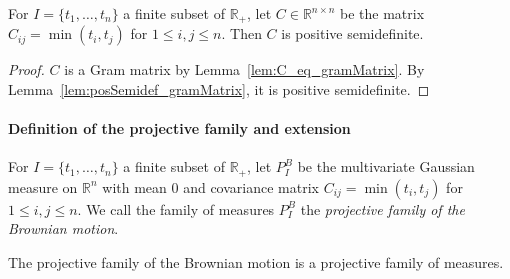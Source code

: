 \begin{lemma}\label{lem:posSemidef_brownianCov}
For $I = \{t_1, \ldots, t_n\}$ a finite subset of $\mathbb{R}_+$, let $C \in \mathbb{R}^{n \times n}$ be the matrix $C_{ij} = \min(t_i, t_j)$ for $1 \leq i,j \leq n$.
Then $C$ is positive semidefinite.
\end{lemma}

\begin{proof}
$C$ is a Gram matrix by Lemma~\ref{lem:C_eq_gramMatrix}.
By Lemma~\ref{lem:posSemidef_gramMatrix}, it is positive semidefinite.
\end{proof}


\paragraph{Definition of the projective family and extension}

\begin{definition}\label{def:gaussianProjectiveFamily}
For $I = \{t_1, \ldots, t_n\}$ a finite subset of $\mathbb{R}_+$, let $P^B_I$ be the multivariate Gaussian measure on $\mathbb{R}^n$ with mean $0$ and covariance matrix $C_{ij} = \min(t_i, t_j)$ for $1 \leq i,j \leq n$.
We call the family of measures $P^B_I$ the \emph{projective family of the Brownian motion}.
\end{definition}


\begin{lemma}\label{lem:isProjectiveMeasureFamily_gaussianProjectiveFamily}
The projective family of the Brownian motion is a projective family of measures.
\end{lemma}

